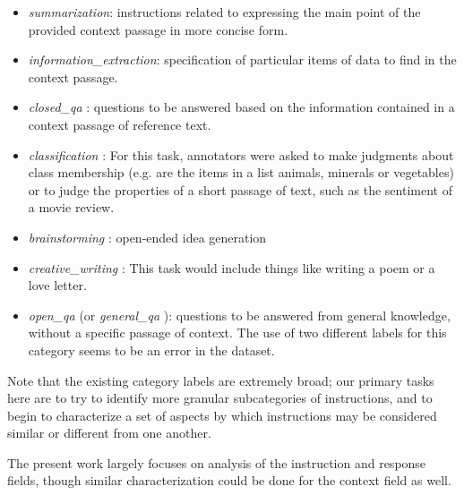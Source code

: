 \begin{itemize}

\item {\em summarization}: instructions related to expressing the main point of the provided context passage in more concise form.

\item {\em information\_extraction}: specification of particular items of data to find in the context passage.

\item {\em closed\_qa }: questions to be answered based on the information contained in a context passage of reference text.

\item {\em classification }: For this task, annotators were asked to make judgments about class membership (e.g. are the items in a list animals, minerals or vegetables) or to judge the properties of a short passage of text, such as the sentiment of a movie review.

\item {\em brainstorming }: open-ended idea generation

\item {\em creative\_writing }: This task would include things like writing a poem or a love letter.

\item {\em open\_qa } (or {\em general\_qa }): questions to be answered from general knowledge, without a specific passage of context. The use of two different labels for this category seems to be an error in the dataset.
\end{itemize}

Note that the existing category labels are extremely broad; our primary tasks here are to try to identify more granular subcategories of instructions, and to begin to characterize a set of aspects by which instructions may be considered similar or different from one another. 

The present work largely focuses on analysis of the instruction and response fields, though similar characterization could be done for the context field as well.